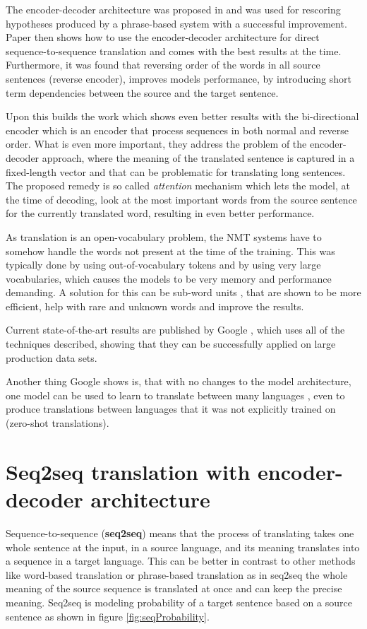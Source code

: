 \documentclass{ExcelAtFIT}
\begin{document}
The encoder-decoder architecture was proposed in \cite{encoderDecoder} and was used for rescoring hypotheses produced by a phrase-based system with a successful improvement. Paper \cite{seq2seq} then shows how to use the encoder-decoder architecture for direct sequence-to-sequence translation and comes with the best results at the time. Furthermore, it was found that reversing order of the words in all source sentences (reverse encoder), improves models performance, by introducing short term dependencies between the source and the target sentence.

Upon this builds the work \cite{attention} which shows even better results with the bi-directional encoder which is an encoder that process sequences in both normal and reverse order. What is even more important, they address the problem of the encoder-decoder approach, where the meaning of the translated sentence is captured in a fixed-length vector and that can be problematic for translating long sentences. The proposed remedy is so called \emph{attention} mechanism which lets the model, at the time of decoding, look at the most important words from the source sentence for the currently translated word, resulting in even better performance.

As translation is an open-vocabulary problem, the NMT systems have to somehow handle the words not present at the time of the training. This was typically done by using out-of-vocabulary tokens and by using very large vocabularies, which causes the models to be very memory and performance demanding. A solution for this can be sub-word units \cite{mikolovSubwords, subwords}, that are shown to be more efficient, help with rare and unknown words and improve the results.

Current state-of-the-art results are published by Google \cite{googleBridgingGap,googleAttention}, which uses all of the techniques described, showing that they can be successfully applied on large production data sets.

Another thing Google shows is, that with no changes to the model architecture, one model can be used to learn to translate between many languages \cite{googleMultiLingual}, even to produce translations between languages that it was not explicitly trained on (zero-shot translations).

\section{Seq2seq translation with encoder-decoder architecture}
Sequence-to-sequence (\textbf{seq2seq}) means that the process of translating takes one whole sentence at the input, in a source language, and its meaning translates into a sequence in a target language. This can be better in contrast to other methods like word-based translation or phrase-based translation as in seq2seq the whole meaning of the source sequence is translated at once and can keep the precise meaning. Seq2seq is modeling probability of a target sentence based on a source sentence as shown in figure \ref{fig:seqProbability}.
\end{document}
